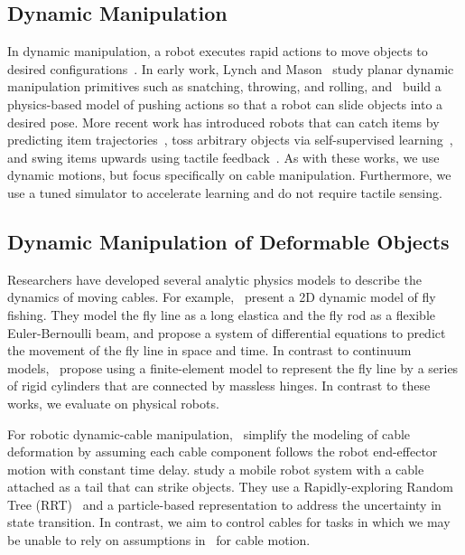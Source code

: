\documentclass[letterpaper, 10pt, conference]{ieeeconf}  %
\newcommand{\remark}[3]{{\color{#2}[#1: #3]}}
\newcommand{\jeffi}[1]{\remark{JI}{red}{#1}}
\begin{document}
\subsection{Dynamic Manipulation}

In dynamic manipulation, a robot executes rapid actions to move objects to desired configurations~\cite{lynch_mason_1993}. 
In early work, Lynch and Mason~\cite{lynch1999dynamic} study planar dynamic manipulation primitives such as snatching, throwing, and rolling, and~\citet{ruiz2011fast} build a physics-based model of pushing actions so that a robot can slide objects into a desired pose.
More recent work has introduced robots that can catch items by predicting item trajectories~\cite{catching_2014}, toss arbitrary objects via self-supervised learning~\cite{zeng_tossing_2019}, 
and swing items upwards using tactile feedback~\cite{swingbot_2020}.
As with these works, we use dynamic motions, but focus specifically on cable manipulation. Furthermore, we use a tuned simulator to accelerate learning and do not require tactile sensing.


\subsection{Dynamic Manipulation of Deformable Objects}

Researchers have developed several analytic physics models to describe the dynamics of moving cables. For example,~\citet{fly_fishing_2004} present a 2D dynamic model of fly fishing. They model the fly line as a long elastica and the fly rod as a flexible Euler-Bernoulli beam, and propose a system of differential equations to predict the movement of the fly line in space and time. 
In contrast to continuum models,~\citet{wang2011analysis} propose using a finite-element model to represent the fly line by a series of rigid cylinders that are connected by massless hinges. In contrast to these works, we evaluate on physical robots.

For robotic dynamic-cable manipulation,~\citet{dynamic_knotting_2010,yamakawa2012simple,high_speed_knotting_2013,one_hand_knotting_tactile_2007} 
simplify the modeling of cable deformation by assuming each cable component follows the robot end-effector motion with constant time delay. %
\citet{kim2016using} study a mobile robot system with a cable attached as a tail that can strike objects.
They use a Rapidly-exploring Random Tree (RRT)~\cite{RRT_2001} and a particle-based representation to address the uncertainty in state transition. In contrast, we aim to control cables for tasks in which we may be unable to rely on assumptions in~\cite{yamakawa2012simple,kim2016using} for cable motion.
\end{document}
